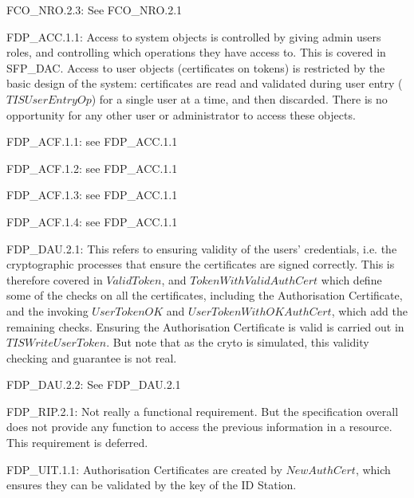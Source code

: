 {\footnotesize \sf 
FCO\_NRO.2.3:
}
\newline
	See FCO\_NRO.2.1

{\footnotesize \sf 
FDP\_ACC.1.1:
}
\newline
	Access to system objects is controlled by giving admin users
	roles, and controlling which operations they have access
	to. This is covered in SFP\_DAC. Access to user objects
	(certificates on tokens) is restricted by the basic design of
	the system: certificates are read and validated during user
	entry ($TISUserEntryOp$) for a single user at a time, and then
	discarded. There is no opportunity for any other user or
	administrator to access these objects. 

{\footnotesize \sf 
FDP\_ACF.1.1:
}
\newline
	see FDP\_ACC.1.1

{\footnotesize \sf 
FDP\_ACF.1.2:
}
\newline
	see FDP\_ACC.1.1

{\footnotesize \sf 
FDP\_ACF.1.3:
}
\newline
	see FDP\_ACC.1.1

{\footnotesize \sf 
FDP\_ACF.1.4:
}
\newline
	see FDP\_ACC.1.1
	
{\footnotesize \sf 
FDP\_DAU.2.1:
}
\newline
	This refers to ensuring validity of the users' credentials,
	i.e. the cryptographic processes that ensure the certificates
	are signed correctly. This is therefore covered in
	$ValidToken$, and $TokenWithValidAuthCert$
	which define some of the checks on all the certificates,
	including the Authorisation Certificate, and the invoking
	$UserTokenOK$ and $UserTokenWithOKAuthCert$, which add the
	remaining checks. Ensuring the Authorisation Certificate is
	valid is carried out in $TISWriteUserToken$. But note that as
	the cryto is simulated, this validity checking and guarantee
	is not real. 

{\footnotesize \sf 
FDP\_DAU.2.2:
}
\newline
	See FDP\_DAU.2.1

{\footnotesize \sf 
FDP\_RIP.2.1:
}
\newline
	Not really a functional requirement. But the specification
	overall does not provide any function to access the previous
	information in a resource. This requirement is deferred.

{\footnotesize \sf 
FDP\_UIT.1.1:
}
\newline
	Authorisation Certificates are created by $NewAuthCert$, which
	ensures they can be validated by the key of the ID Station. 

